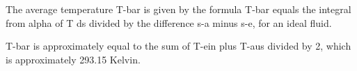 The average temperature T-bar is given by the formula T-bar equals the integral from alpha of T ds divided by the difference s-a minus s-e, for an ideal fluid.

T-bar is approximately equal to the sum of T-ein plus T-aus divided by 2, which is approximately 293.15 Kelvin.